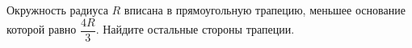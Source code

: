 \begin{ex}
	\begin{condition}
		Окружность радиуса \( R  \) вписана в прямоугольную	трапецию, меньшее основание которой равно \( \dfrac{4R}{3} \). Найдите остальные стороны трапеции.
	\end{condition}
\end{ex}